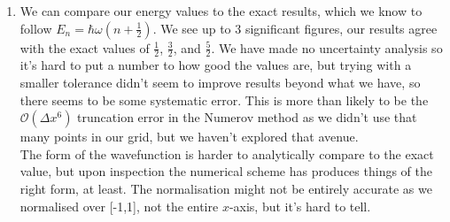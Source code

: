 \documentclass[11pt]{article}
\begin{document}
\begin{enumerate}
\begin{enumerate}
        \item We can compare our energy values to the exact results, which we know to follow $E_n=\hbar\omega\left(n+\frac 12\right)$. We see up to 3 significant figures, our results agree with the exact values of $\frac 12$, $\frac 32$, and $\frac 52$. We have made no uncertainty analysis so it's hard to put a number to how good the values are, but trying with a smaller tolerance didn't seem to improve results beyond what we have, so there seems to be some systematic error. This is more than likely to be the $\mathcal{O}(\Delta x^6)$ truncation error in the Numerov method as we didn't use that many points in our grid, but we haven't explored that avenue.\\
        The form of the wavefunction is harder to analytically compare to the exact value, but upon inspection the numerical scheme has produces things of the right form, at least. The normalisation might not be entirely accurate as we normalised over [-1,1], not the entire $x$-axis, but it's hard to tell.
        
    \end{enumerate}

\end{enumerate}
\end{document}
